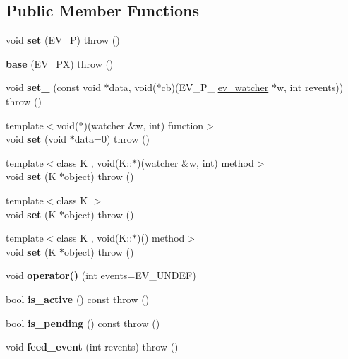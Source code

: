 \subsection*{Public Member Functions}
\begin{DoxyCompactItemize}
\item 
\hypertarget{structev_1_1base_acd2c4ed63d3d85fe1503c6a6af79f51f}{}\label{structev_1_1base_acd2c4ed63d3d85fe1503c6a6af79f51f} 
void {\bfseries set} (E\+V\+\_\+P)  throw ()
\item 
\hypertarget{structev_1_1base_ab7bfdea240e4e074f69a330b21839d12}{}\label{structev_1_1base_ab7bfdea240e4e074f69a330b21839d12} 
{\bfseries base} (E\+V\+\_\+\+PX)  throw ()
\item 
\hypertarget{structev_1_1base_af0230caac76aec855cafc1e4a3d8e175}{}\label{structev_1_1base_af0230caac76aec855cafc1e4a3d8e175} 
void {\bfseries set\+\_\+} (const void $\ast$data, void($\ast$cb)(E\+V\+\_\+\+P\+\_\+ \hyperlink{structev__watcher}{ev\+\_\+watcher} $\ast$w, int revents))  throw ()
\item 
\hypertarget{structev_1_1base_aadf4502b7360ca663e9d841d5a8f707a}{}\label{structev_1_1base_aadf4502b7360ca663e9d841d5a8f707a} 
{\footnotesize template$<$void($\ast$)(watcher \&w, int) function$>$ }\\void {\bfseries set} (void $\ast$data=0)  throw ()
\item 
\hypertarget{structev_1_1base_a080c40e6b23fd8027c7a92c218164158}{}\label{structev_1_1base_a080c40e6b23fd8027c7a92c218164158} 
{\footnotesize template$<$class K , void(\+K\+::$\ast$)(watcher \&w, int) method$>$ }\\void {\bfseries set} (K $\ast$object)  throw ()
\item 
\hypertarget{structev_1_1base_a8c76c4def5296155bdc75119628ba6cc}{}\label{structev_1_1base_a8c76c4def5296155bdc75119628ba6cc} 
{\footnotesize template$<$class K $>$ }\\void {\bfseries set} (K $\ast$object)  throw ()
\item 
\hypertarget{structev_1_1base_a080c40e6b23fd8027c7a92c218164158}{}\label{structev_1_1base_a080c40e6b23fd8027c7a92c218164158} 
{\footnotesize template$<$class K , void(\+K\+::$\ast$)() method$>$ }\\void {\bfseries set} (K $\ast$object)  throw ()
\item 
\hypertarget{structev_1_1base_ac4075a29836b2b4f55010e83ce35a38c}{}\label{structev_1_1base_ac4075a29836b2b4f55010e83ce35a38c} 
void {\bfseries operator()} (int events=E\+V\+\_\+\+U\+N\+D\+EF)
\item 
\hypertarget{structev_1_1base_ad05881991b3f36232ec5e62ac11a12c3}{}\label{structev_1_1base_ad05881991b3f36232ec5e62ac11a12c3} 
bool {\bfseries is\+\_\+active} () const  throw ()
\item 
\hypertarget{structev_1_1base_ada2222858acbaa831ddea15eee7c9275}{}\label{structev_1_1base_ada2222858acbaa831ddea15eee7c9275} 
bool {\bfseries is\+\_\+pending} () const  throw ()
\item 
\hypertarget{structev_1_1base_af7e3eb231cd60757cc2c5f97c5ab1015}{}\label{structev_1_1base_af7e3eb231cd60757cc2c5f97c5ab1015} 
void {\bfseries feed\+\_\+event} (int revents)  throw ()
\end{DoxyCompactItemize}
